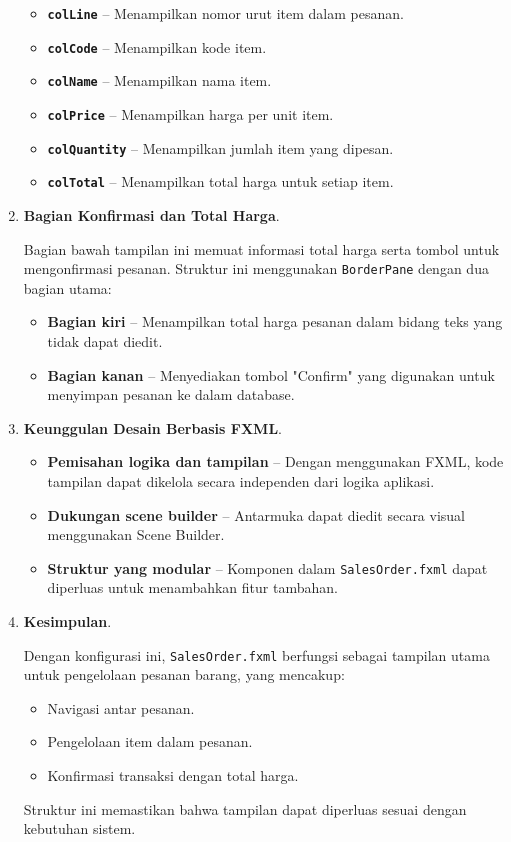 \begin{enumerate}
	\begin{itemize}
		\item \textbf{\texttt{colLine}} – Menampilkan nomor urut item dalam pesanan.
		\item \textbf{\texttt{colCode}} – Menampilkan kode item.
		\item \textbf{\texttt{colName}} – Menampilkan nama item.
		\item \textbf{\texttt{colPrice}} – Menampilkan harga per unit item.
		\item \textbf{\texttt{colQuantity}} – Menampilkan jumlah item yang dipesan.
		\item \textbf{\texttt{colTotal}} – Menampilkan total harga untuk setiap item.
	\end{itemize}
	
	\item \textbf{Bagian Konfirmasi dan Total Harga}.
	
	Bagian bawah tampilan ini memuat informasi total harga serta tombol untuk mengonfirmasi pesanan. Struktur ini menggunakan \texttt{BorderPane} dengan dua bagian utama:
	
	\begin{itemize}
		\item \textbf{Bagian kiri} – Menampilkan total harga pesanan dalam bidang teks yang tidak dapat diedit.
		\item \textbf{Bagian kanan} – Menyediakan tombol "Confirm" yang digunakan untuk menyimpan pesanan ke dalam database.
	\end{itemize}
	
	\item \textbf{Keunggulan Desain Berbasis FXML}.
	
	\begin{itemize}
		\item \textbf{Pemisahan logika dan tampilan} – Dengan menggunakan FXML, kode tampilan dapat dikelola secara independen dari logika aplikasi.
		\item \textbf{Dukungan scene builder} – Antarmuka dapat diedit secara visual menggunakan Scene Builder.
		\item \textbf{Struktur yang modular} – Komponen dalam \texttt{SalesOrder.fxml} dapat diperluas untuk menambahkan fitur tambahan.
	\end{itemize}
	
	\item \textbf{Kesimpulan}.
	
	Dengan konfigurasi ini, \texttt{SalesOrder.fxml} berfungsi sebagai tampilan utama untuk pengelolaan pesanan barang, yang mencakup:
	
	\begin{itemize}
		\item Navigasi antar pesanan.
		\item Pengelolaan item dalam pesanan.
		\item Konfirmasi transaksi dengan total harga.
	\end{itemize}
	
	Struktur ini memastikan bahwa tampilan dapat diperluas sesuai dengan kebutuhan sistem.
\end{enumerate}

